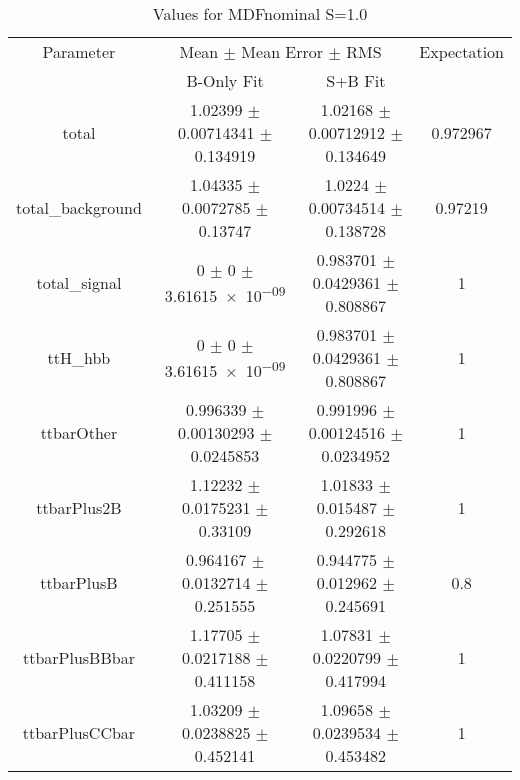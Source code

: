 \begin{table}
\centering
\caption{Values for MDFnominal S=1.0}
\begin{tabular}{cccc}
\toprule
Parameter & \multicolumn{2}{c}{Mean $\pm$ Mean Error $\pm$ RMS} & Expectation\\
 & B-Only Fit & S+B Fit & \\
\midrule
total & \num{1.02399} $\pm$ \num{0.00714341} $\pm$ \num{0.134919} & \num{1.02168} $\pm$ \num{0.00712912} $\pm$ \num{0.134649} & \num{0.972967}\\
total\_background & \num{1.04335} $\pm$ \num{0.0072785} $\pm$ \num{0.13747} & \num{1.0224} $\pm$ \num{0.00734514} $\pm$ \num{0.138728} & \num{0.97219}\\
total\_signal & \num{0} $\pm$ \num{0} $\pm$ \num{3.61615e-09} & \num{0.983701} $\pm$ \num{0.0429361} $\pm$ \num{0.808867} & \num{1}\\
ttH\_hbb & \num{0} $\pm$ \num{0} $\pm$ \num{3.61615e-09} & \num{0.983701} $\pm$ \num{0.0429361} $\pm$ \num{0.808867} & \num{1}\\
ttbarOther & \num{0.996339} $\pm$ \num{0.00130293} $\pm$ \num{0.0245853} & \num{0.991996} $\pm$ \num{0.00124516} $\pm$ \num{0.0234952} & \num{1}\\
ttbarPlus2B & \num{1.12232} $\pm$ \num{0.0175231} $\pm$ \num{0.33109} & \num{1.01833} $\pm$ \num{0.015487} $\pm$ \num{0.292618} & \num{1}\\
ttbarPlusB & \num{0.964167} $\pm$ \num{0.0132714} $\pm$ \num{0.251555} & \num{0.944775} $\pm$ \num{0.012962} $\pm$ \num{0.245691} & \num{0.8}\\
ttbarPlusBBbar & \num{1.17705} $\pm$ \num{0.0217188} $\pm$ \num{0.411158} & \num{1.07831} $\pm$ \num{0.0220799} $\pm$ \num{0.417994} & \num{1}\\
ttbarPlusCCbar & \num{1.03209} $\pm$ \num{0.0238825} $\pm$ \num{0.452141} & \num{1.09658} $\pm$ \num{0.0239534} $\pm$ \num{0.453482} & \num{1}\\
\bottomrule
\end{tabular}
\end{table}